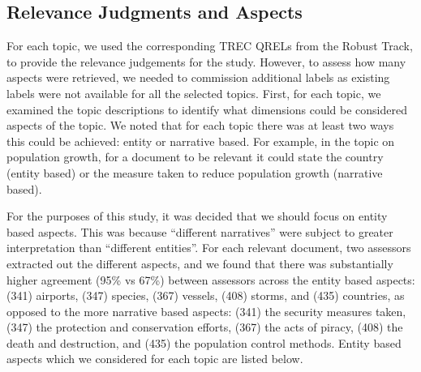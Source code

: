 \subsection{Relevance Judgments and Aspects}\label{sec:method:entities}
For each topic, we used the corresponding TREC QRELs from the Robust Track, to provide the relevance judgements for the study. However, to assess how many aspects were retrieved, we needed to commission additional labels as existing labels were not available for all the selected topics. First, for each topic, we examined the topic descriptions to identify what dimensions could be considered aspects of the topic. We noted that for each topic there was at least two ways this could be achieved: entity or narrative based. For example, in the topic on population growth, for a document to be relevant it could state the country (entity based) or the measure taken to reduce  population growth (narrative based). 

For the purposes of this study, it was decided that we should focus on entity based aspects. This was because ``different narratives'' were subject to greater interpretation than ``different entities''. For each relevant document, two assessors extracted out the different aspects, and we found that there was substantially higher agreement (95\% vs 67\%) between assessors across the entity based aspects: (341) airports, (347) species, (367) vessels, (408) storms, and  (435) countries, as opposed to the more narrative based aspects: (341) the security measures taken, (347) the protection and conservation efforts, (367) the acts of piracy, (408) the death and destruction, and (435) the population control methods.  Entity based aspects which we considered for each topic are listed below.

